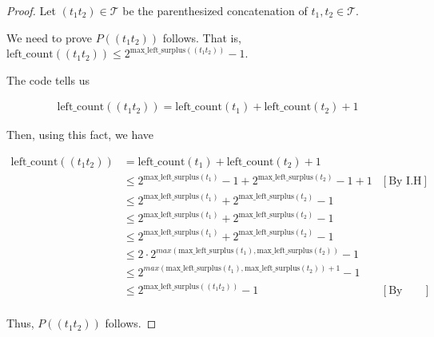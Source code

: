 \documentclass[12pt]{article}
\begin{document}
\begin{enumerate}[a.]
\begin{proof}
    \bigskip

    Let $(t_1t_2) \in \mathcal{T}$ be the parenthesized concatenation of $t_1,t_2 \in \mathcal{T}$.

    \bigskip

    We need to prove $P((t_1t_2))$ follows. That is, $\text{left\_count}((t_1t_2))
    \leq 2^{\text{max\_left\_surplus}((t_1t_2))}-1$.

    \bigskip

    The code tells us

    \begin{align}
        \text{left\_count}((t_1t_2)) = \text{left\_count}(t_1) + \text{left\_count}(t_2) + 1
    \end{align}

    Then, using this fact, we have

    \begin{align}
        \text{left\_count}((t_1t_2)) &= \text{left\_count}(t_1) + \text{left\_count}(t_2) + 1\\
        &\leq 2^{\text{max\_left\_surplus}(t_1)}-1 + 2^{\text{max\_left\_surplus}(t_2)} - 1 + 1 & [\text{By I.H}]\\
        &\leq 2^{\text{max\_left\_surplus}(t_1)} + 2^{\text{max\_left\_surplus}(t_2)} - 1\\
        &\leq 2^{\text{max\_left\_surplus}(t_1)} + 2^{\text{max\_left\_surplus}(t_2)} - 1\\
        &\leq 2^{\text{max\_left\_surplus}(t_1)} + 2^{\text{max\_left\_surplus}(t_2)} - 1\\
        &\leq 2 \cdot 2^{max(\text{max\_left\_surplus}(t_1),\text{max\_left\_surplus}(t_2))} - 1\\
        &\leq 2^{max(\text{max\_left\_surplus}(t_1),\text{max\_left\_surplus}(t_2)) + 1} - 1\\
        &\leq 2^{\text{max\_left\_surplus}((t_1t_2))} - 1 & [\text{By hint}]\\
    \end{align}

    \bigskip

    Thus, $P((t_1t_2))$ follows.

    \end{proof}






\end{enumerate}
\end{document}
